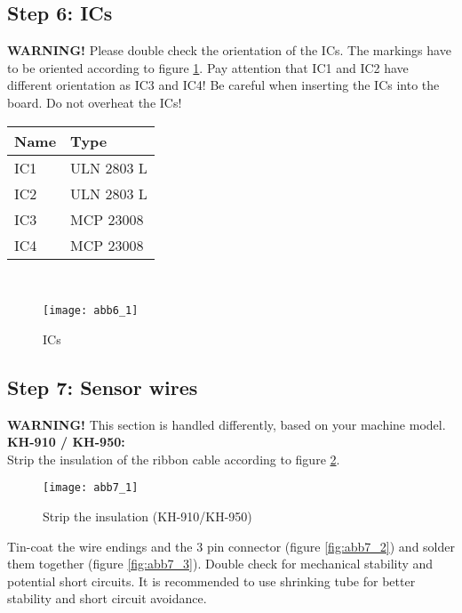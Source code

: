 \documentclass[fleqn,10pt]{SelfArx} %
\begin{document}
\FloatBarrier

 \subsection*{Step 6: ICs}

\textbf{WARNING!} Please double check the orientation of the ICs. The markings have to be oriented according to figure \ref{fig:abb6_1}. Pay attention that IC1 and IC2 have different orientation as IC3 and IC4! Be careful when inserting the ICs into the board. Do not overheat the ICs!\\
\begin{tabular}{ll}
\hline
\textbf{Name} & \textbf{Type} \\ \hline
IC1           & ULN 2803 L   \\ \hline
IC2           & ULN 2803 L   \\ \hline
IC3           & MCP 23008    \\ \hline
IC4           & MCP 23008    \\ \hline
\end{tabular}\\

\begin{figure}[tbhp]\centering
\texttt{[image: abb6\_1]}
\caption{ICs}
\label{fig:abb6_1}
\end{figure}

\FloatBarrier

 \subsection*{Step 7: Sensor wires}

\textbf{WARNING!} This section is handled differently, based on your machine model.\\

\textbf{KH-910 / KH-950:} \\

Strip the insulation of the ribbon cable according to figure \ref{fig:abb7_1}.

\begin{figure}[tbhp]\centering
\texttt{[image: abb7\_1]}
\caption{Strip the insulation (KH-910/KH-950)}
\label{fig:abb7_1}
\end{figure}

Tin-coat the wire endings and the 3 pin connector (figure \ref{fig:abb7_2}) and solder them together (figure \ref{fig:abb7_3}). Double check for mechanical stability and potential short circuits. It is recommended to use shrinking tube for better stability and short circuit avoidance.
\end{document}
